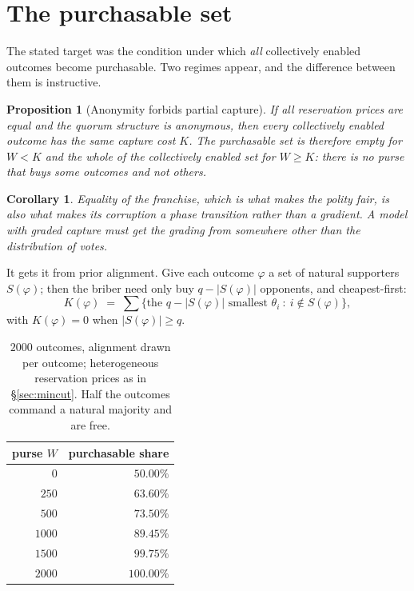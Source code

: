 \documentclass[11pt]{article}
\theoremstyle{plain}
\newtheorem{proposition}[theorem]{Proposition}
\newtheorem{corollary}[theorem]{Corollary}
\theoremstyle{definition}
\theoremstyle{remark}
\begin{document}
\section{The purchasable set}
\label{sec:purchasable}

The stated target was the condition under which \emph{all} collectively enabled
outcomes become purchasable. Two regimes appear, and the difference between
them is instructive.

\begin{proposition}[Anonymity forbids partial capture]
\label{prop:phase}
If all reservation prices are equal and the quorum structure is anonymous, then
every collectively enabled outcome has the same capture cost $K$. The
purchasable set is therefore empty for $W < K$ and the whole of the
collectively enabled set for $W \ge K$: there is no purse that buys some
outcomes and not others.
\end{proposition}

\begin{corollary}
Equality of the franchise, which is what makes the polity fair, is also what
makes its corruption a phase transition rather than a gradient. A model with
graded capture must get the grading from somewhere other than the distribution
of votes.
\end{corollary}

It gets it from prior alignment. Give each outcome $\varphi$ a set of natural
supporters $S(\varphi)$; then the briber need only buy $q - |S(\varphi)|$
opponents, and cheapest-first:
\[
  K(\varphi) \;=\; \textstyle\sum \bigl\{\text{the } q - |S(\varphi)| \text{ smallest }
  \theta_i \ :\ i \notin S(\varphi)\bigr\},
\]
with $K(\varphi) = 0$ when $|S(\varphi)| \ge q$.

\begin{table}[t]
\centering
\begin{tabular}{rr}
\toprule
purse $W$ & purchasable share\\
\midrule
$0$ & $50.00\%$\\
$250$ & $63.60\%$\\
$500$ & $73.50\%$\\
$1000$ & $89.45\%$\\
$1500$ & $99.75\%$\\
$2000$ & $100.00\%$\\
\bottomrule
\end{tabular}
\caption{$2000$ outcomes, alignment drawn per outcome; heterogeneous
reservation prices as in \S\ref{sec:mincut}. Half the outcomes command a
natural majority and are free.}
\label{tab:purse}
\end{table}
\end{document}
